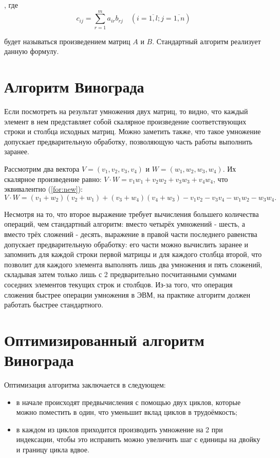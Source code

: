 \documentclass[12pt]{report}
\begin{document}
, где
\begin{equation}
	\label{eq:M}
	c_{ij} =
	\sum_{r=1}^{m} a_{ir}b_{rj} \quad (i=\overline{1,l}; j=\overline{1,n})
\end{equation}

будет называться произведением матриц $A$ и $B$.
Стандартный алгоритм реализует данную формулу.

\section{Алгоритм Винограда}

Если посмотреть на результат умножения двух матриц, то видно, что каждый элемент в нем представляет собой скалярное произведение соответствующих строки и столбца исходных матриц.
Можно заметить также, что такое умножение допускает предварительную обработку, позволяющую часть работы выполнить заранее.

Рассмотрим два вектора $V = (v_1, v_2, v_3, v_4)$ и $W = (w_1, w_2, w_3, w_4)$.
Их скалярное произведение равно: $V \cdot W = v_1w_1 + v_2w_2 + v_3w_3 + v_4w_4$, что эквивалентно (\ref{for:new}):
\begin{equation}
	\label{for:new}
	V \cdot W = (v_1 + w_2)(v_2 + w_1) + (v_3 + w_4)(v_4 + w_3) - v_1v_2 - v_3v_4 - w_1w_2 - w_3w_4.
\end{equation}

Несмотря на то, что второе выражение требует вычисления большего количества операций, чем стандартный алгоритм: вместо четырёх умножений - шесть, а вместо трёх сложений - десять, выражение в правой части последнего равенства допускает предварительную обработку: его части можно вычислить заранее и запомнить для каждой строки первой матрицы и для каждого столбца второй, что позволит для каждого элемента выполнять лишь два умножения и пять сложений, складывая затем только лишь с 2 предварительно посчитанными суммами соседних элементов текущих строк и столбцов.
Из-за того, что операция сложения быстрее операции умножения в ЭВМ, на практике алгоритм должен работать быстрее стандартного.

\section{Оптимизированный алгоритм Винограда}

Оптимизация алгоритма заключается в следующем:
\begin{itemize}
	\item в начале происходят предвычисления с помощью двух циклов, которые можно поместить в один, что уменьшит вклад циклов в трудоёмкость;
	\item в каждом из циклов приходится производить умножение на 2 при индексации, чтобы это исправить можно увеличить шаг с единицы на двойку и границу цикла вдвое.
\end{itemize}
\end{document}
